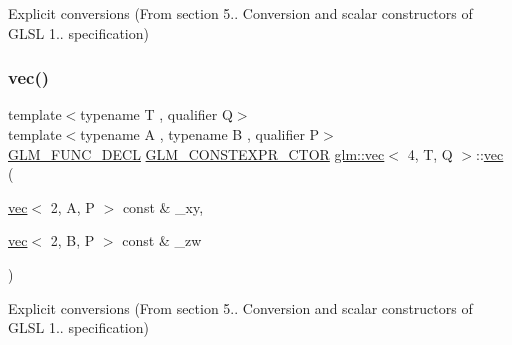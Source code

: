 Explicit conversions (From section 5.. Conversion and scalar constructors of G\+L\+SL 1.. specification) 

\mbox{\label{structglm_1_1vec_3_014_00_01_t_00_01_q_01_4_af18e05d8f9e28ed3dab7cd8b2150fede}} 
\subsubsection{\texorpdfstring{vec()}{vec()}\hspace{0.1cm}{\footnotesize\ttfamily [18/34]}}
{\footnotesize\ttfamily template$<$typename T , qualifier Q$>$ \\
template$<$typename A , typename B , qualifier P$>$ \\
\hyperlink{setup_8hpp_ab2d052de21a70539923e9bcbf6e83a51}{G\+L\+M\+\_\+\+F\+U\+N\+C\+\_\+\+D\+E\+CL} \hyperlink{setup_8hpp_ad34178a09666081abdb573c14d1f4a5a}{G\+L\+M\+\_\+\+C\+O\+N\+S\+T\+E\+X\+P\+R\+\_\+\+C\+T\+OR} \hyperlink{structglm_1_1vec}{glm\+::vec}$<$ 4, T, Q $>$\+::\hyperlink{structglm_1_1vec}{vec} (\begin{DoxyParamCaption}\item[{\hyperlink{structglm_1_1vec}{vec}$<$ 2, A, P $>$ const \&}]{\+\_\+xy,  }\item[{\hyperlink{structglm_1_1vec}{vec}$<$ 2, B, P $>$ const \&}]{\+\_\+zw }\end{DoxyParamCaption})}



Explicit conversions (From section 5.. Conversion and scalar constructors of G\+L\+SL 1.. specification) 

\mbox{\label{structglm_1_1vec_3_014_00_01_t_00_01_q_01_4_ad1532b19e40e767e98e2ca54aef6a6f4}} 
